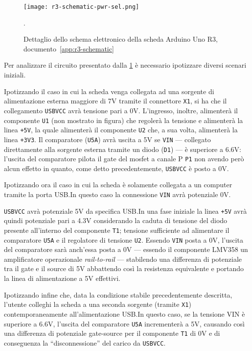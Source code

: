 \begin{figure}[t]
    \centering
    \texttt{[image: r3-schematic-pwr-sel.png]}
    \caption[Dettaglio dello schema elettronico posto in appendice, documento~\ref{app:r3-schematic}]{Dettaglio dello schema elettronico della scheda Arduino Uno R3, documento~\ref{app:r3-schematic}~\cite{site:r3-schematic}}\label{fig:r3-schematic-pwr-sel-detail}.
\end{figure}

Per analizzare il circuito presentato dalla \cref{fig:r3-schematic-pwr-sel-detail} è necessario ipotizzare diversi scenari iniziali.

Ipotizzando il caso in cui la scheda venga collegata ad una sorgente di alimentazione esterna maggiore di 7V tramite il connettore \texttt{X1}, si ha che il collegamento \texttt{USBVCC} avrà tensione pari a 0V.
L'ingresso, inoltre, alimenterà il componente \texttt{U1} (non mostrato in figura) che regolerà la tensione e alimenterà la linea \texttt{+5V}, la quale alimenterà il componente \texttt{U2} che, a sua volta, alimenterà la linea \texttt{+3V3}.
Il comparatore (\texttt{U5A}) avrà uscita a 5V se \texttt{VIN} --- collegato direttamente alla sorgente esterna tramite un diodo (\texttt{D1}) --- è superiore a 6.6V: l'uscita del comparatore pilota il gate del mosfet a canale P \texttt{P1} non avendo però alcun effetto in quanto, come detto precedentemente, \texttt{USBVCC} è posto a 0V.

Ipotizzando ora il caso in cui la scheda è solamente collegata a un computer tramite la porta USB.\@ In questo caso la connessione \texttt{VIN} avrà potenziale 0V.

\texttt{USBVCC} avrà potenziale 5V da specifica USB.\@ In una fase iniziale la linea \texttt{+5V} avrà quindi potenziale pari a 4.3V considerando la caduta di tensione del diodo presente all'interno del componente \texttt{T1}; tensione sufficiente ad alimentare il comparatore \texttt{U5A} e il regolatore di tensione \texttt{U2}.
Essendo \texttt{VIN} posta a 0V, l'uscita del comparatore sarà anch'essa posta a 0V --- essendo il componente LMV358 un amplificatore operazionale \textit{rail-to-rail}\cite{ti:lmv358} ---
stabilendo una differenza di potenziale tra il gate e il source di 5V abbattendo così la resistenza equivalente e portando la linea di alimentazione a 5V effettivi\cite{onsemi:fdn340p}.

Ipotizzando infine che, data la condizione stabile precedentemente descritta, l'utente colleghi la scheda a una seconda sorgente (tramite \texttt{X1}) contemporaneamente all'alimentazione USB.\@ In questo caso, se la tensione VIN è superiore a 6.6V, l'uscita del comparatore \texttt{U5A} incrementerà a 5V, causando così una differenza di potenziale gate-source per il componente \texttt{T1} di 0V e di conseguenza la ``disconnessione'' del carico da \texttt{USBVCC}.

